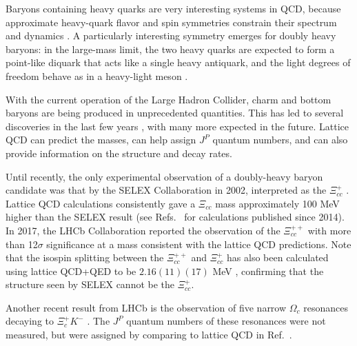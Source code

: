 Baryons containing heavy quarks are very interesting systems in QCD, because approximate heavy-quark flavor and spin symmetries
constrain their spectrum and dynamics \cite{Korner:1994nh, Manohar:2000dt}.
A particularly interesting symmetry emerges for doubly heavy baryons: in the large-mass limit, the two heavy quarks
are expected to form a point-like diquark that acts like a single heavy antiquark, and the light degrees of freedom behave as in a
heavy-light meson \cite{Savage:1990di, Brambilla:2005yk}.

With the current operation of the Large Hadron Collider, charm and bottom baryons are being produced in unprecedented quantities.
This has led to several discoveries in the last few years \cite{Chatrchyan:2012ni, Aaij:2012da, Aaij:2014yka, Aaij:2016jnn, Aaij:2017ueg,  Aaij:2017vbw, Aaij:2017nav}, with many more expected in the future. Lattice QCD
can predict the masses, can help assign $J^P$ quantum numbers, and can also provide information on the structure and decay rates.

Until recently, the only experimental observation of a doubly-heavy baryon candidate was that by the SELEX Collaboration in 2002,
interpreted as the $\Xi_{cc}^+$ \cite{Mattson:2002vu}. Lattice QCD calculations consistently gave a $\Xi_{cc}$ mass approximately
100 MeV higher than the SELEX result (see Refs.~\cite{Brown:2014ena, Padmanath:2015jea, Bali:2015lka, Alexandrou:2017xwd} for calculations published since 2014).
In 2017, the LHCb Collaboration reported the observation of the $\Xi_{cc}^{++}$ with more than 12$\sigma$ significance \cite{Aaij:2017ueg} at a mass consistent with the lattice QCD predictions.
Note that the isospin splitting between the $\Xi_{cc}^{++}$ and $\Xi_{cc}^{+}$ has also been calculated using lattice QCD+QED to be $2.16(11)(17)$ MeV \cite{Borsanyi:2014jba}, confirming that
the structure seen by SELEX cannot be the $\Xi_{cc}^{+}$.

Another recent result from LHCb is the observation of five narrow $\Omega_c$ resonances decaying to $\Xi_c^+ K^-$ \cite{Aaij:2017nav}. The $J^P$ quantum
numbers of these resonances were not measured, but were assigned by comparing to lattice QCD in Ref.~\cite{Padmanath:2017lng}.

